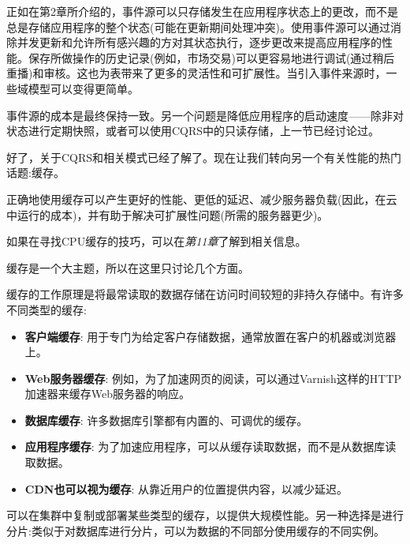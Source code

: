 正如在第2章所介绍的，事件源可以只存储发生在应用程序状态上的更改，而不是总是存储应用程序的整个状态(可能在更新期间处理冲突)。使用事件源可以通过消除并发更新和允许所有感兴趣的方对其状态执行，逐步更改来提高应用程序的性能。保存所做操作的历史记录(例如，市场交易)可以更容易地进行调试(通过稍后重播)和审核。这也为表带来了更多的灵活性和可扩展性。当引入事件来源时，一些域模型可以变得更简单。

事件源的成本是最终保持一致。另一个问题是降低应用程序的启动速度——除非对状态进行定期快照，或者可以使用CQRS中的只读存储，上一节已经讨论过。

好了，关于CQRS和相关模式已经了解了。现在让我们转向另一个有关性能的热门话题:缓存。


正确地使用缓存可以产生更好的性能、更低的延迟、减少服务器负载(因此，在云中运行的成本)，并有助于解决可扩展性问题(所需的服务器更少)。

\begin{tcolorbox}[colback=blue!5!white,colframe=blue!75!black, title=Note]
\hspace*{0.7cm}如果在寻找CPU缓存的技巧，可以在\textit{第11章}了解到相关信息。
\end{tcolorbox}

缓存是一个大主题，所以在这里只讨论几个方面。

缓存的工作原理是将最常读取的数据存储在访问时间较短的非持久存储中。有许多不同类型的缓存:

\begin{itemize}
\item 
\textbf{客户端缓存}: 用于专门为给定客户存储数据，通常放置在客户的机器或浏览器上。

\item 
\textbf{Web服务器缓存}: 例如，为了加速网页的阅读，可以通过Varnish这样的HTTP加速器来缓存Web服务器的响应。

\item
\textbf{数据库缓存}: 许多数据库引擎都有内置的、可调优的缓存。

\item
\textbf{应用程序缓存}: 为了加速应用程序，可以从缓存读取数据，而不是从数据库读取数据。

\item
\textbf{CDN也可以视为缓存}: 从靠近用户的位置提供内容，以减少延迟。
\end{itemize}

可以在集群中复制或部署某些类型的缓存，以提供大规模性能。另一种选择是进行分片:类似于对数据库进行分片，可以为数据的不同部分使用缓存的不同实例。

